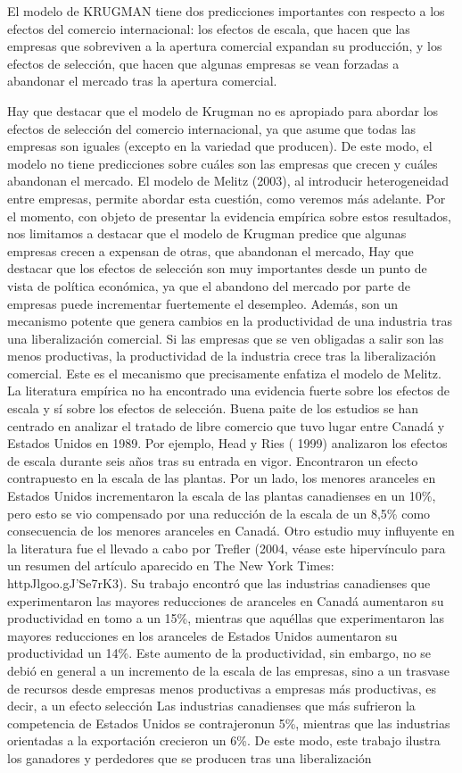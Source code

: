 \documentclass[10pt,a4paper]{article}
\begin{document}
El modelo de KRUGMAN tiene dos predicciones importantes con respecto a los efectos del comercio internacional: los efectos de escala, que hacen que las empresas que sobreviven a la apertura comercial expandan su producción, y los efectos de selección, que hacen que algunas empresas se vean forzadas a abandonar el mercado tras la apertura comercial.


Hay que destacar que el modelo de Krugman no es apropiado para abordar los efectos de selección del comercio internacional, ya que asume que todas las empresas son iguales (excepto en la variedad que producen). De este modo, el modelo no tiene predicciones sobre cuáles son las empresas que crecen y cuáles abandonan el mercado. El modelo de Melitz (2003), al introducir heterogeneidad entre empresas, permite abordar esta cuestión, como veremos más adelante. Por el momento, con objeto de presentar la evidencia empírica sobre estos resultados, nos limitamos a destacar que el modelo de Krugman predice que algunas empresas crecen a expensan de otras, que abandonan el mercado, Hay que destacar que los efectos de selección son muy importantes desde un punto de vista de política económica, ya que el abandono del mercado por parte de empresas puede incrementar fuertemente el desempleo. Además, son un mecanismo potente que genera cambios en la productividad de una industria tras una liberalización comercial. Si las empresas que se ven obligadas a salir son las menos productivas, la productividad de la industria crece tras la liberalización comercial. Este es el mecanismo que precisamente enfatiza el modelo de Melitz. La literatura empírica no ha encontrado una evidencia fuerte sobre los efectos de escala y sí sobre los efectos de selección. Buena paite de los estudios se han centrado en analizar el tratado de libre comercio que tuvo lugar entre Canadá y Estados Unidos en 1989. Por ejemplo, Head y Ries ( 1999) analizaron los efectos de escala durante seis años tras su entrada en vigor. Encontraron un efecto contrapuesto en la escala de las plantas. Por un lado, los menores aranceles en Estados Unidos incrementaron la escala de las plantas canadienses en un 10\%, pero esto se vio compensado por una reducción de la escala de un 8,5\% como consecuencia de los menores aranceles en Canadá. Otro estudio muy influyente en la literatura fue el llevado a cabo por Trefler (2004, véase este hipervínculo para un resumen del artículo aparecido en The New York Times: httpJlgoo.gJ'Se7rK3). Su trabajo encontró que las industrias canadienses que experimentaron las mayores reducciones de aranceles en Canadá aumentaron su productividad en tomo a un 15\%, mientras que aquéllas que experimentaron las mayores reducciones en los aranceles de Estados Unidos aumentaron su productividad un 14\%. Este aumento de la productividad, sin embargo, no se debió en general a un incremento de la escala de las empresas, sino a un trasvase de recursos desde empresas menos productivas a empresas más productivas, es decir, a un efecto selección Las industrias canadienses que más sufrieron la competencia de Estados Unidos se contrajeronun 5\%, mientras que las industrias orientadas a la exportación crecieron un 6\%. De este modo, este trabajo ilustra los ganadores y perdedores que se producen tras una liberalización 
\end{document}
